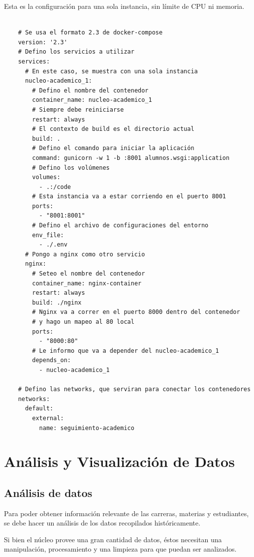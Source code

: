 Esta es la configuración para una sola instancia, sin límite de CPU ni memoria.


\begin{verbatim}
    
    # Se usa el formato 2.3 de docker-compose
    version: '2.3'
    # Defino los servicios a utilizar
    services:
      # En este caso, se muestra con una sola instancia
      nucleo-academico_1:
        # Defino el nombre del contenedor
        container_name: nucleo-academico_1
        # Siempre debe reiniciarse
        restart: always
        # El contexto de build es el directorio actual
        build: .
        # Defino el comando para iniciar la aplicación
        command: gunicorn -w 1 -b :8001 alumnos.wsgi:application
        # Defino los volúmenes
        volumes:
          - .:/code
        # Esta instancia va a estar corriendo en el puerto 8001
        ports:
          - "8001:8001"
        # Defino el archivo de configuraciones del entorno
        env_file:
          - ./.env
      # Pongo a nginx como otro servicio
      nginx:
        # Seteo el nombre del contenedor
        container_name: nginx-container
        restart: always
        build: ./nginx
        # Nginx va a correr en el puerto 8000 dentro del contenedor 
        # y hago un mapeo al 80 local
        ports:
          - "8000:80"
        # Le informo que va a depender del nucleo-academico_1
        depends_on:
          - nucleo-academico_1
    
    # Defino las networks, que serviran para conectar los contenedores
    networks:
      default:
        external:
          name: seguimiento-academico
  \end{verbatim}

\section[Análisis y Visualización de Datos]{Análisis y Visualización de Datos}

\subsection{Análisis de datos}

Para poder obtener información relevante de las carreras, materias y estudiantes, se debe hacer un análisis de los datos recopilados históricamente.

Si bien el núcleo provee una gran cantidad de datos, éstos necesitan una manipulación, procesamiento y una limpieza para que puedan ser analizados.

